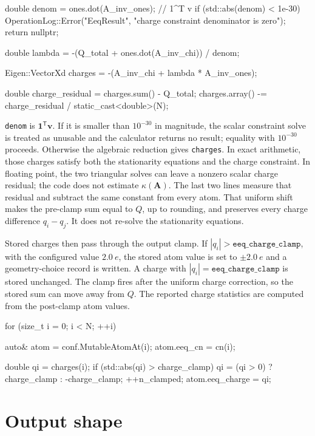 \documentclass[11pt]{article}
\newcommand{\code}[1]{\texttt{#1}}
\begin{document}
\begin{codebox}
double denom = ones.dot(A_inv_ones);        // 1^T v
if (std::abs(denom) < 1e-30) {
    OperationLog::Error("EeqResult",
        "charge constraint denominator is zero");
    return nullptr;
}

double lambda =
    -(Q_total + ones.dot(A_inv_chi)) / denom;

Eigen::VectorXd charges =
    -(A_inv_chi + lambda * A_inv_ones);

double charge_residual = charges.sum() - Q_total;
charges.array() -= charge_residual / static_cast<double>(N);
\end{codebox}

\code{denom} is \(\bm 1^{\mathsf T}\bm v\). If it is smaller than \(10^{-30}\)
in magnitude, the scalar constraint solve is treated as unusable and the
calculator returns no result; equality with \(10^{-30}\) proceeds. Otherwise the
algebraic reduction gives
\code{charges}. In exact arithmetic, those charges satisfy both the stationarity
equations and the charge constraint. In floating point, the two triangular
solves can leave a nonzero scalar charge residual; the code does not estimate
\(\kappa(\bm A)\). The last two lines measure that residual and subtract the
same constant from every atom. That uniform shift makes the pre-clamp sum equal
to \(Q\), up to rounding, and preserves every charge difference \(q_i-q_j\). It
does not re-solve the stationarity equations.

Stored charges then pass through the output clamp. If
\(|q_i|>\code{eeq\_charge\_clamp}\), with the configured value
\(\SI{2.0}{\elementarycharge}\), the stored atom value is set to
\(\pm\SI{2.0}{\elementarycharge}\) and a geometry-choice record is written. A
charge with \(|q_i|=\code{eeq\_charge\_clamp}\) is stored unchanged. The clamp
fires after the uniform charge correction, so the stored sum can move away from
\(Q\). The reported charge statistics are computed from the post-clamp atom
values.

\begin{codebox}
for (size_t i = 0; i < N; ++i) {
    auto& atom = conf.MutableAtomAt(i);
    atom.eeq_cn = cn(i);

    double qi = charges(i);
    if (std::abs(qi) > charge_clamp) {
        qi = (qi > 0) ? charge_clamp : -charge_clamp;
        ++n_clamped;
    }
    atom.eeq_charge = qi;
}
\end{codebox}

\section{Output shape}
\end{document}

